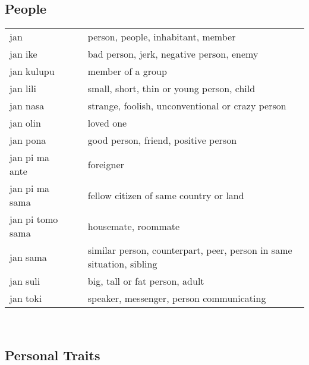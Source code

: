 \subsection{People}

\begin{supertabular}{p{4,5cm}|ll}
    jan              &  & person, people, inhabitant, member                                   \\
    jan ike          &  & bad person, jerk, negative person, enemy                             \\
    jan kulupu       &  & member of a group                                                    \\
    jan lili         &  & small, short, thin or young person, child                            \\
    jan nasa         &  & strange, foolish, unconventional or crazy person                     \\
    jan olin         &  & loved one                                                            \\
    jan pona         &  & good person, friend, positive person                                 \\
    jan pi ma ante   &  & foreigner                                                            \\
    jan pi ma sama   &  & fellow citizen of same country or land                               \\
    jan pi tomo sama &  & housemate, roommate                                                  \\
    jan sama         &  & similar person, counterpart, peer, person in same situation, sibling \\
    jan suli         &  & big, tall or fat person, adult                                       \\
    jan toki         &  & speaker, messenger, person communicating                             \\
\end{supertabular} \\

\subsection{Personal Traits}

